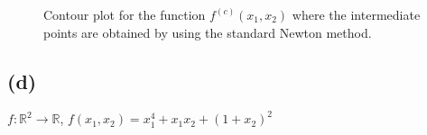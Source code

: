 \documentclass[a4paper,11pt]{article}
\begin{document}
	\begin{figure}[H]
		\centering
		 \quad
		\caption{Contour plot for the function $f^{(c)}(x_{1},x_{2})$ where the intermediate points are obtained by using the standard Newton method.}
		\label{Fig:func_c}
	\end{figure}

	\subsection{(d)}
	$f:\mathbb{R}^{2} \rightarrow  \mathbb{R}$, $f(x_{1},x_{2}) = x_{1}^{4} + x_{1}x_{2} + (1+x_{2})^{2}$
	
\end{document}

